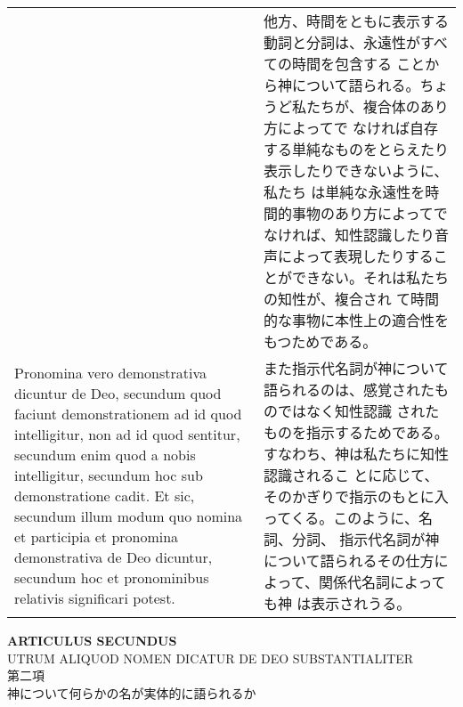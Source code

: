\documentclass[paper=a4paper,fontsize=10pt,jafontsize=9pt,titlepage]{jlreq}
\begin{document}
\begin{longtable}{p{21em}p{21em}}
&

他方、時間をともに表示する動詞と分詞は、永遠性がすべての時間を包含する
ことから神について語られる。ちょうど私たちが、複合体のあり方によってで
なければ自存する単純なものをとらえたり表示したりできないように、私たち
は単純な永遠性を時間的事物のあり方によってでなければ、知性認識したり音
声によって表現したりすることができない。それは私たちの知性が、複合され
て時間的な事物に本性上の適合性をもつためである。

\\

Pronomina vero demonstrativa dicuntur de Deo, secundum quod faciunt
demonstrationem ad id quod intelligitur, non ad id quod sentitur,
secundum enim quod a nobis intelligitur, secundum hoc sub
demonstratione cadit. Et sic, secundum illum modum quo nomina et
participia et pronomina demonstrativa de Deo dicuntur, secundum hoc et
pronominibus relativis significari potest.

&

また指示代名詞が神について語られるのは、感覚されたものではなく知性認識
されたものを指示するためである。すなわち、神は私たちに知性認識されるこ
とに応じて、そのかぎりで指示のもとに入ってくる。このように、名詞、分詞、
指示代名詞が神について語られるその仕方によって、関係代名詞によっても神
は表示されうる。

\end{longtable}

\newpage
{}

\begin{center}
{\Large {\bfseries ARTICULUS SECUNDUS}}\\
{\large UTRUM ALIQUOD NOMEN DICATUR DE DEO SUBSTANTIALITER\\
第二項\\
神について何らかの名が実体的に語られるか}
\end{center}
\end{document}

